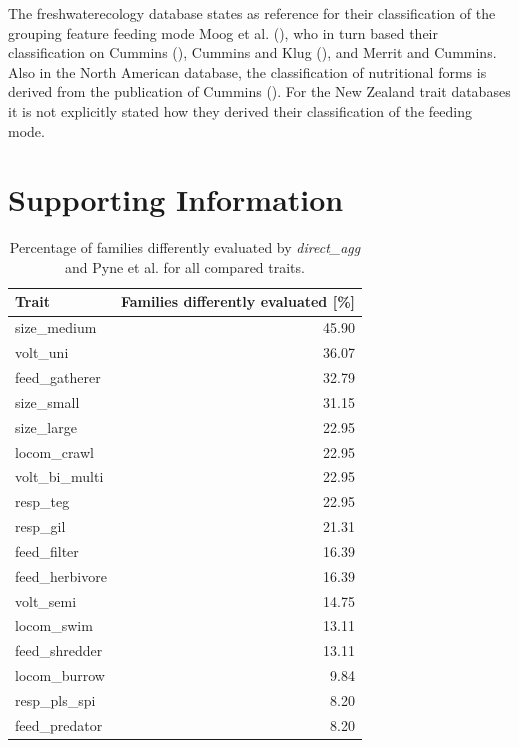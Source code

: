 \documentclass{article}
\begin{document}
The freshwaterecology database states as reference for their classification of the grouping feature feeding mode Moog et al. (\cite{moog_comprehensive_nodate}), who in turn based their classification on Cummins (\cite{cummins_trophic_1973}), Cummins and Klug (\cite{cummins_feeding_1979}), and Merrit and Cummins.
Also in the North American database, the classification of nutritional forms is derived from the publication of Cummins (\cite{cummins_trophic_1973}).
For the New Zealand trait databases it is not explicitly stated how they derived their classification of the feeding mode.



%

\newpage
\printbibliography

\section{Supporting Information}

\begin{table}[H]
  \centering
  \caption{Percentage of families differently evaluated by 
  \textit{direct\_agg} and Pyne et al. for all compared traits.} 
  \label{tab:SI_perc_dir_agg_expert_NOA}
  \begin{tabular}{lr}
    \hline
  Trait & Families differently evaluated [\%] \\ 
    \hline
    size\_medium & 45.90 \\ 
    volt\_uni & 36.07 \\ 
    feed\_gatherer & 32.79 \\ 
    size\_small & 31.15 \\ 
    size\_large & 22.95 \\ 
    locom\_crawl & 22.95 \\ 
    volt\_bi\_multi & 22.95 \\ 
    resp\_teg & 22.95 \\ 
    resp\_gil & 21.31 \\ 
    feed\_filter & 16.39 \\ 
    feed\_herbivore & 16.39 \\ 
    volt\_semi & 14.75 \\ 
    locom\_swim & 13.11 \\ 
    feed\_shredder & 13.11 \\ 
    locom\_burrow & 9.84 \\ 
    resp\_pls\_spi & 8.20 \\ 
    feed\_predator & 8.20 \\ 
     \hline
  \end{tabular}
  \end{table}
\end{document}
